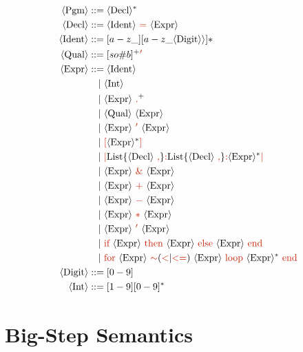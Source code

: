 \documentclass[letterpaper,12pt]{article}
\begin{document}
\newcommand{\nt}[1]{\textcolor{syntax_color}{#1}}
\newcommand{\ntext}[1]{\textcolor{syntax_color}{\text{#1}}}
\newcommand{\term}[1]{\langle \text{#1} \rangle}
\begin{align*}
    \term{Pgm} &::= \langle \text{Decl} \rangle^* \\
    \langle \text{Decl} \rangle &::= \term{Ident} \ \ntext{=} \ \langle \text{Expr} \rangle \\
    \term{Ident} &::= [a-z\_][a-z\_\term{Digit} \rangle]* \\
    \term{Qual} &::= [so\#b]^+\textcolor{syntax_color}{'} \\
        \term{Expr} &::= \langle \text{Ident} \rangle \\
        &\quad | \ \langle \text{Int} \rangle \\
        &\quad | \ \term{Expr} \ \textcolor{syntax_color}{.}^+ \\
        &\quad | \ \term{Qual} \ \term{Expr} \\
        &\quad | \ \term{Expr} \ \nt{'} \ \term{Expr} \\
        &\quad | \ \nt{[} \term{Expr}^* \nt{]} \\
        &\quad | \ \nt{|} \text{List}\lbrace \term{Decl}\ \nt{,}\rbrace\nt{:} \text{List}\lbrace \term{Decl}\ \nt{,}\rbrace \nt{:} \term{Expr}^* \nt{|} \\
        &\quad | \ \term{Expr} \ \nt{\&} \ \term{Expr} \\
        &\quad | \ \term{Expr} \ \nt{+} \ \term{Expr} \\
        &\quad | \ \term{Expr} \ \nt{-} \ \term{Expr} \\
        &\quad | \ \term{Expr} \ \nt{*} \ \term{Expr} \\
        &\quad | \ \term{Expr} \ \nt{'} \ \term{Expr} \\
        &\quad | \ \ntext{\text{if}}\  \term{Expr} \ \ntext{then}\ \term{Expr} \ \ntext{else}\ \term{Expr} \ \ntext{end} \\
        &\quad | \ \textcolor{syntax_color}{\text{for}}\  \term{Expr} \ \textcolor{syntax_color}{\sim}{(\nt{<}|\nt{<=})}\ \term{Expr} \ \textcolor{syntax_color}{\text{loop}}\ \term{Expr}^* \ \ntext{end} \\    
   \term{Digit} &::= {[0-9]} \\
    \term{Int} &::= {[1-9][0-9]^*}
\end{align*}


\section{Big-Step Semantics}
\end{document}
